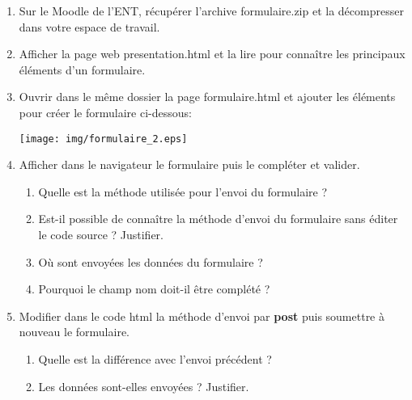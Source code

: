 \documentclass[11pt,a4paper]{article}
\begin{document}
\begin{enumerate}
\item Sur le Moodle de l'ENT, récupérer l'archive formulaire.zip et la décompresser dans votre espace de travail.

\item Afficher la page web \textsf{presentation.html} et la lire pour connaître les principaux éléments d'un formulaire.

\item Ouvrir dans le même dossier la page \textsf{formulaire.html} et ajouter les éléments pour créer le formulaire ci-dessous:

\begin{center}
\texttt{[image: img/formulaire\_2.eps]}
\end{center}

\item Afficher dans le navigateur le formulaire puis le compléter et valider.

\begin{enumerate}
\item Quelle est la méthode utilisée pour l'envoi du formulaire ? \vspace{2cm}

\item Est-il possible de connaître la méthode d'envoi du formulaire sans  éditer le code source ? Justifier.\vspace{2cm}

\item Où sont envoyées les données du formulaire ? \vspace{2cm}

\item Pourquoi le champ \textsf{nom} doit-il être complété ?\vspace{2cm}

\end{enumerate}

\item Modifier dans le code \textsf{html} la méthode d'envoi par \textbf{post} puis soumettre à nouveau le formulaire.
\begin{enumerate}
\item Quelle est la différence avec l'envoi précédent ?\vspace{2cm}

\item Les données sont-elles envoyées ? Justifier. \vspace{2cm}

\end{enumerate}


\end{enumerate}
\end{document}
